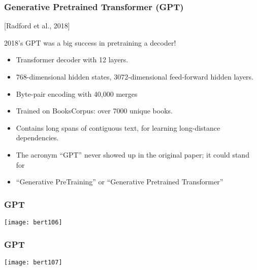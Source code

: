 \begin{frame}[fragile]\frametitle{Generative Pretrained Transformer (GPT)}

[Radford et al., 2018]

2018’s GPT was a big success in pretraining a decoder!


      \begin{itemize}
			\item Transformer decoder with 12 layers.
			\item 768-dimensional hidden states, 3072-dimensional feed-forward hidden layers.
			\item Byte-pair encoding with 40,000 merges
			\item Trained on BooksCorpus: over 7000 unique books.
			\item Contains long spans of contiguous text, for learning long-distance dependencies.
			\item The acronym ``GPT'' never showed up in the original paper; it could stand for
			\item ``Generative PreTraining'' or ``Generative Pretrained Transformer''
			\end{itemize}

			

\end{frame}

\begin{frame}[fragile]\frametitle{GPT}

			\begin{center}
			\texttt{[image: bert106]}
			\end{center}		
			

\end{frame}

\begin{frame}[fragile]\frametitle{GPT}

			\begin{center}
			\texttt{[image: bert107]}
			\end{center}		
			

\end{frame}

